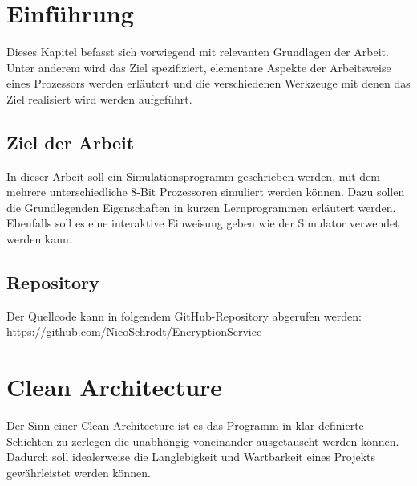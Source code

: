 \documentclass[12pt]{article}
\begin{document}
\clearpairofpagestyles
\clearmainofpairofpagestyles

\ihead[]{\leftmark} %

\cfoot[\pagemark]{\pagemark} %



\section{Einführung}
Dieses Kapitel befasst sich vorwiegend mit relevanten Grundlagen der Arbeit. Unter anderem wird das Ziel spezifiziert, elementare Aspekte der Arbeitsweise eines Prozessors werden erläutert und die verschiedenen Werkzeuge mit denen das Ziel realisiert wird werden aufgeführt.

\subsection{Ziel der Arbeit}
In dieser Arbeit soll ein Simulationsprogramm geschrieben werden, mit dem mehrere unterschiedliche 8-Bit Prozessoren simuliert werden können. Dazu sollen die Grundlegenden Eigenschaften in kurzen Lernprogrammen erläutert werden. Ebenfalls soll es eine interaktive Einweisung geben wie der Simulator verwendet werden kann.

\subsection{Repository}
Der Quellcode kann in folgendem GitHub-Repository abgerufen werden:\\ \url{https://github.com/NicoSchrodt/EncryptionService}

\newpage

\section{Clean Architecture}
Der Sinn einer Clean Architecture ist es das Programm in klar definierte Schichten zu zerlegen die unabhängig voneinander ausgetauscht werden können. Dadurch soll idealerweise die Langlebigkeit und Wartbarkeit eines Projekts gewährleistet werden können.
\end{document}

